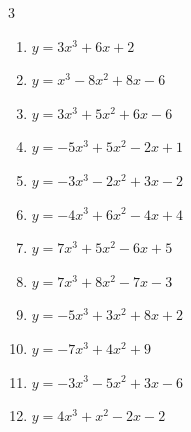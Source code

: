 \begin{multicols}{3}
\begin{enumerate}

  \item $y=3x^{3}+6x+2$


  \item $y=x^{3}-8x^{2}+8x-6$


  \item $y=3x^{3}+5x^{2}+6x-6$


  \item $y=-5x^{3}+5x^{2}-2x+1$


  \item $y=-3x^{3}-2x^{2}+3x-2$


  \item $y=-4x^{3}+6x^{2}-4x+4$


  \item $y=7x^{3}+5x^{2}-6x+5$


  \item $y=7x^{3}+8x^{2}-7x-3$


\columnbreak %

\resetques

  \item $y=-5x^{3}+3x^{2}+8x+2$


  \item $y=-7x^{3}+4x^{2}+9$


  \item $y=-3x^{3}-5x^{2}+3x-6$


  \item $y=4x^{3}+x^{2}-2x-2$


\end{enumerate}
\end{multicols}
